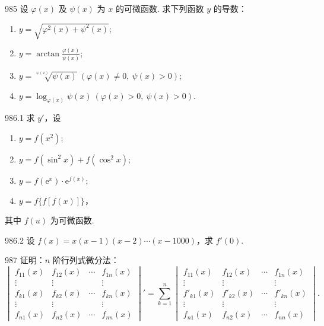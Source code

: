 \begin{prob}[L]{985}
设 $\varphi(x)$ 及 $\psi(x)$ 为 $x$ 的可微函数. 求下列函数 $y$ 的导数：
\begin{enumerate}[label=(\alph*), itemsep=2pt, topsep=3pt]
\item $y = \sqrt{\varphi^2(x) + \psi^2(x)}$;
\item $y = \arctan \frac{\varphi(x)}{\psi(x)}$;
\item $y = \sqrt[\varphi(x)]{\psi(x)} \ (\varphi(x) \neq 0, \ \psi(x) > 0)$;
\item $y = \log_{\varphi(x)} \psi(x) \ (\varphi(x) > 0, \ \psi(x) > 0)$.
\end{enumerate}
\end{prob}

\begin{prob}[L]{986.1}
求 $y'$，设
\begin{enumerate}[label=(\alph*), itemsep=2pt, topsep=3pt]
\item $y = f(x^2)$;
\item $y = f(\sin^2 x) + f(\cos^2 x)$;
\item $y = f(\mathrm{e}^x) \cdot \mathrm{e}^{f(x)}$;
\item $y = f\{f[f(x)]\}$，
\end{enumerate}
其中 $f(u)$ 为可微函数.
\end{prob}

\begin{prob}[M]{986.2}
设 $f(x) = x(x - 1)(x - 2)\cdots(x - 1000)$，求 $f'(0)$.
\end{prob}

\begin{prob}[L]{987}
证明：$n$ 阶行列式微分法：
\[
\begin{vmatrix}
f_{11}(x) & f_{12}(x) & \cdots & f_{1n}(x) \\
\vdots & \vdots & & \vdots \\
f_{k1}(x) & f_{k2}(x) & \cdots & f_{kn}(x) \\
\vdots & \vdots & & \vdots \\
f_{n1}(x) & f_{n2}(x) & \cdots & f_{nn}(x)
\end{vmatrix}'
= \sum_{k=1}^{n}
\begin{vmatrix}
f_{11}(x) & f_{12}(x) & \cdots & f_{1n}(x) \\
\vdots & \vdots & & \vdots \\
f'_{k1}(x) & f'_{k2}(x) & \cdots & f'_{kn}(x) \\
\vdots & \vdots & & \vdots \\
f_{n1}(x) & f_{n2}(x) & \cdots & f_{nn}(x)
\end{vmatrix}.
\]
\end{prob}

